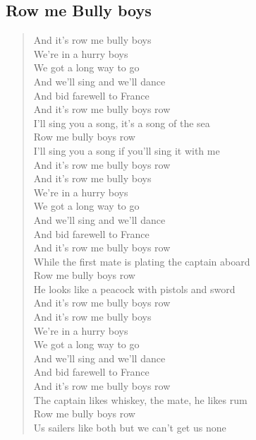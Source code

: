 \documentclass[11pt]{article}
\begin{document}
\subsection{Row me Bully boys}
\label{sec:orge457bfd}
\begin{verse}
And it's row me bully boys\\
We're in a hurry boys\\
We got a long way to go\\
And we'll sing and we'll dance\\
And bid farewell to France\\
And it's row me bully boys row\\
\vspace*{1em}
I'll sing you a song, it's a song of the sea\\
Row me bully boys row\\
I'll sing you a song if you'll sing it with me\\
And it's row me bully boys row\\
\vspace*{1em}
And it's row me bully boys\\
We're in a hurry boys\\
We got a long way to go\\
And we'll sing and we'll dance\\
And bid farewell to France\\
And it's row me bully boys row\\
\vspace*{1em}
While the first mate is plating the captain aboard\\
Row me bully boys row\\
He looks like a peacock with pistols and sword\\
And it's row me bully boys row\\
\vspace*{1em}
And it's row me bully boys\\
We're in a hurry boys\\
We got a long way to go\\
And we'll sing and we'll dance\\
And bid farewell to France\\
And it's row me bully boys row\\
\vspace*{1em}
The captain likes whiskey, the mate, he likes rum\\
Row me bully boys row\\
Us sailers like both but we can't get us none\\

\end{verse}
\end{document}
